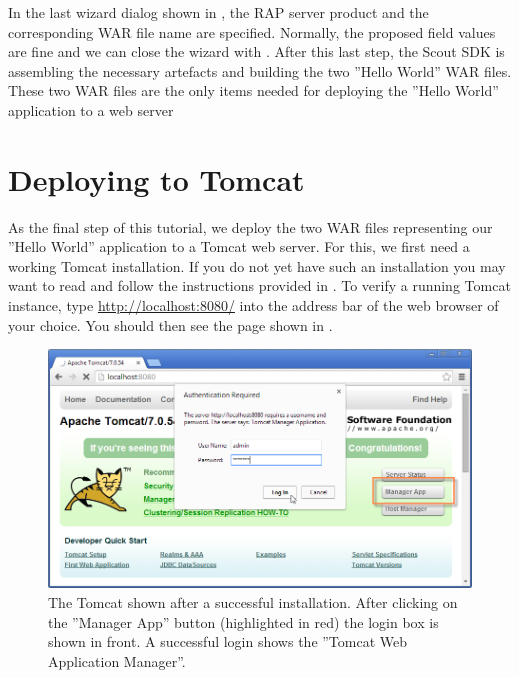 \documentclass[a4paper,10pt,twoside]{book}
\begin{document}
In the last wizard dialog shown in , the RAP server product and the corresponding WAR file name are specified.
Normally, the proposed field values are fine and we can close the wizard with .
After this last step, the Scout SDK is assembling the necessary artefacts and building the two ''Hello World'' WAR files.
These two WAR files are the only items needed for deploying the ''Hello World'' application to a web server

\section{Deploying to Tomcat}

As the final step of this tutorial, we deploy the two WAR files representing our ''Hello World'' application to a Tomcat web server.
For this, we first need a working Tomcat installation.
If you do not yet have such an installation you may want to read and follow the instructions provided in .
To verify a running Tomcat instance, type \url{http://localhost:8080/} into the address bar of the web browser of your choice.
You should then see the page shown in .

\begin{figure}
\includegraphics[width=14cm]{tomcat_managerapp_login.png} 
\caption{The Tomcat shown after a successful installation. 
After clicking on the ''Manager App'' button (highlighted in red) the login box is shown in front.
A successful login shows the ''Tomcat Web Application Manager''.}
\end{figure}
\end{document}
